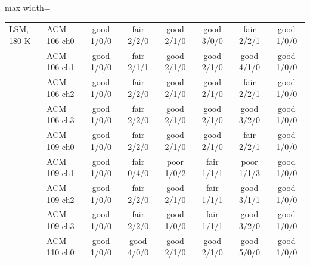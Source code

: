 \begin{table}[H]
\begin{adjustbox}{max width=\linewidth}
\begin{tabular}{llcccccc}
LSM, 180 K & ACM\,106 ch0 & \cellcolor{good}good \scriptsize{1/0/0} & \cellcolor{fair}fair \scriptsize{2/2/0} & \cellcolor{good}good \scriptsize{2/1/0} & \cellcolor{good}good \scriptsize{3/0/0} & \cellcolor{fair}fair \scriptsize{2/2/1} & \cellcolor{good}good \scriptsize{1/0/0}\\
 & ACM\,106 ch1 & \cellcolor{good}good \scriptsize{1/0/0} & \cellcolor{fair}fair \scriptsize{2/1/1} & \cellcolor{good}good \scriptsize{2/1/0} & \cellcolor{good}good \scriptsize{2/1/0} & \cellcolor{good}good \scriptsize{4/1/0} & \cellcolor{good}good \scriptsize{1/0/0}\\
 & ACM\,106 ch2 & \cellcolor{good}good \scriptsize{1/0/0} & \cellcolor{fair}fair \scriptsize{2/2/0} & \cellcolor{good}good \scriptsize{2/1/0} & \cellcolor{good}good \scriptsize{2/1/0} & \cellcolor{fair}fair \scriptsize{2/2/1} & \cellcolor{good}good \scriptsize{1/0/0}\\
 & ACM\,106 ch3 & \cellcolor{good}good \scriptsize{1/0/0} & \cellcolor{fair}fair \scriptsize{2/2/0} & \cellcolor{good}good \scriptsize{2/1/0} & \cellcolor{good}good \scriptsize{2/1/0} & \cellcolor{good}good \scriptsize{3/2/0} & \cellcolor{good}good \scriptsize{1/0/0}\\
 & ACM\,109 ch0 & \cellcolor{good}good \scriptsize{1/0/0} & \cellcolor{fair}fair \scriptsize{2/2/0} & \cellcolor{good}good \scriptsize{2/1/0} & \cellcolor{good}good \scriptsize{2/1/0} & \cellcolor{fair}fair \scriptsize{2/2/1} & \cellcolor{good}good \scriptsize{1/0/0}\\
 & ACM\,109 ch1 & \cellcolor{good}good \scriptsize{1/0/0} & \cellcolor{fair}fair \scriptsize{0/4/0} & \cellcolor{poor}poor \scriptsize{1/0/2} & \cellcolor{fair}fair \scriptsize{1/1/1} & \cellcolor{poor}poor \scriptsize{1/1/3} & \cellcolor{good}good \scriptsize{1/0/0}\\
 & ACM\,109 ch2 & \cellcolor{good}good \scriptsize{1/0/0} & \cellcolor{fair}fair \scriptsize{2/2/0} & \cellcolor{good}good \scriptsize{2/1/0} & \cellcolor{fair}fair \scriptsize{1/1/1} & \cellcolor{good}good \scriptsize{3/1/1} & \cellcolor{good}good \scriptsize{1/0/0}\\
 & ACM\,109 ch3 & \cellcolor{good}good \scriptsize{1/0/0} & \cellcolor{fair}fair \scriptsize{2/2/0} & \cellcolor{good}good \scriptsize{1/0/0} & \cellcolor{fair}fair \scriptsize{1/1/1} & \cellcolor{good}good \scriptsize{3/2/0} & \cellcolor{good}good \scriptsize{1/0/0}\\
 & ACM\,110 ch0 & \cellcolor{good}good \scriptsize{1/0/0} & \cellcolor{good}good \scriptsize{4/0/0} & \cellcolor{good}good \scriptsize{2/1/0} & \cellcolor{good}good \scriptsize{2/1/0} & \cellcolor{good}good \scriptsize{5/0/0} & \cellcolor{good}good \scriptsize{1/0/0}\\

\end{tabular}
\end{adjustbox}
\end{table}
